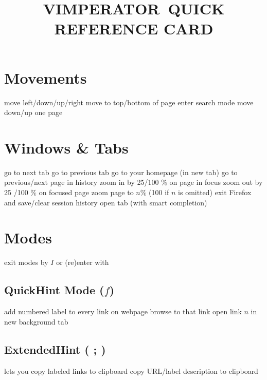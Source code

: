 
\def\content{VIMPERATOR}
\def\versionnumber{0.1}  %
\def\year{2014}
\def\month{Jun}
\def\version{v\versionnumber\ \month\ \year}




\title{\uppercase{\content\ quick reference card}}

\shortintro

\vskip 0.5cm

\section{Movements}{}
	{move left/down/up/right}
	{move to top/bottom of page}
\cmdS{/}	{enter search mode}
\cmdS{\space~\shift\space}	{move down/up one page}

\section{Windows \& Tabs}{}
	{go to next tab}
	{go to previous tab}
	{go to your homepage (in new tab)}
	{go to previous/next page in history}
	{zoom in by 25/100 \% on page in focus}
	{zoom out by 25 /100 \% on focused page}
	{zoom page to $n$\% (100 if $n$ is omitted)}
	{exit Firefox and save/clear session history}
	{open tab (with smart completion)}

\section{Modes}{exit modes by $I$ or (re)enter with }
\subsection{QuickHint Mode ($f$)}{add numbered label to every link on webpage}
	{browse to that link}
	{open link $n$ in new background tab}
\subsection{ExtendedHint ( ; )}{lets you copy labeled links to clipboard}
	{copy URL/label description to clipboard}

